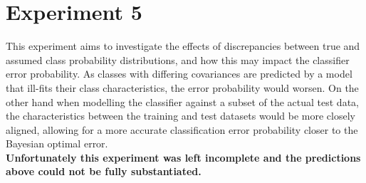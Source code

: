 \section{Experiment 5}
This experiment aims to investigate the effects of discrepancies between true and assumed class probability distributions, and how this may impact the classifier error probability. As classes with differing covariances are predicted by a model that ill-fits their class characteristics, the error probability would worsen. On the other hand when modelling the classifier against a subset of the actual test data, the characteristics between the training and test datasets would be more closely aligned, allowing for a more accurate classification error probability closer to the Bayesian optimal error.\\

\textbf{Unfortunately this experiment was left incomplete and the predictions above could not be fully substantiated.}